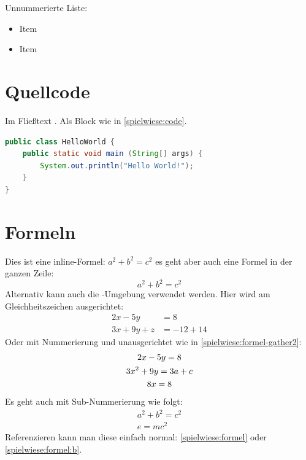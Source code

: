 Unnummerierte Liste:
\begin{itemize}
    \item Item
    \item Item
\end{itemize}

\section{Quellcode}

Im Fließtext .
Als Block wie in \autoref{spielwiese:code}.

\begin{lstlisting}[caption={[Codebeispiel]Codebeispiel mit Hello World in Java}, label=spielwiese:code, float=!ht, language=java]
public class HelloWorld {
    public static void main (String[] args) {
        System.out.println("Hello World!");
    }
}
\end{lstlisting}

\section{Formeln}

Dies ist eine inline-Formel: $a^2+b^2=c^2$ es geht aber auch eine Formel in der ganzen Zeile:
%
$$a^2+b^2=c^2$$
%
Alternativ kann auch die -Umgebung verwendet werden.
Hier wird am Gleichheitszeichen ausgerichtet: %
%
\begin{align*} %
2x - 5y &=  8 \\ 
3x + 9y + z &=  -12 + 14
\end{align*}
%
Oder mit Nummerierung und unausgerichtet wie in \ref{spielwiese:formel-gather2}:
%
\begin{gather} %
2x - 5y = 8 \label{spielwiese:formel-gather1} \\ 
3x^2 + 9y = 3a + c \notag \\ %
8x = 8 \label{spielwiese:formel-gather2}
\end{gather}
%
Es geht auch mit Sub-Nummerierung wie folgt:
\begin{subequations} \label{spielwiese:formel}
	\begin{gather}
		a^2+b^2=c^2 \label{spielwiese:formel:a} \\
		e=mc^2 \label{spielwiese:formel:b}
	\end{gather}
\end{subequations}
%
Referenzieren kann man diese einfach normal: \autoref{spielwiese:formel} oder \ref{spielwiese:formel:b}.

